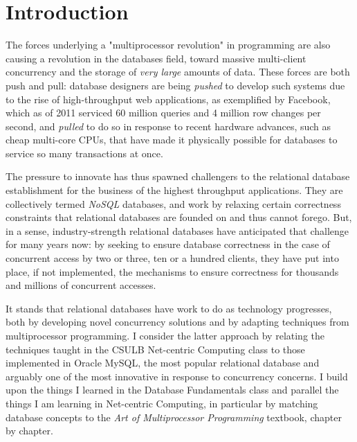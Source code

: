 \documentclass[12pt]{article} %
\begin{document}

\tableofcontents %

\newpage %


\section{Introduction} %
The forces underlying a "multiprocessor revolution" in programming are also causing a revolution in the databases field, toward massive multi-client concurrency and the storage of \textit{very large} amounts of data. These forces are both push and pull: database designers are being \textit{pushed} to develop such systems due to the rise of high-throughput web applications, as exemplified by Facebook, which as of 2011 serviced 60 million queries and 4 million row changes per second, and \textit{pulled} to do so in response to recent hardware advances, such as cheap multi-core CPUs, that have made it physically possible for databases to service so many transactions at once.

The pressure to innovate has thus spawned challengers to the relational database establishment for the business of the highest throughput applications. They are collectively termed \textit{NoSQL} databases, and work by relaxing certain correctness constraints that relational databases are founded on and thus cannot forego. But, in a sense, industry-strength relational databases have anticipated that challenge for many years now: by seeking to ensure database correctness in the case of concurrent access by two or three, ten or a hundred clients, they have put into place, if not implemented, the mechanisms to ensure correctness for thousands and millions of concurrent accesses. 

It stands that relational databases have work to do as technology progresses, both by developing novel concurrency solutions and by adapting techniques from multiprocessor programming. I consider the latter approach by relating the techniques taught in the CSULB Net-centric Computing class to those implemented in Oracle MySQL, the most popular relational database and arguably one of the most innovative in response to concurrency concerns. I build upon the things I learned in the Database Fundamentals class and parallel the things I am learning in Net-centric Computing, in particular by matching database concepts to the \textit{Art of Multiprocessor Programming} textbook, chapter by chapter.
\end{document}
